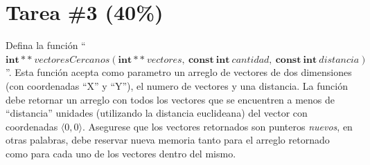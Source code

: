 \documentclass{article}
\begin{document}
\section*{Tarea \#3 (40\%)}

Defina la funci\'on ``$\mathbf{int**}\ vectoresCercanos(\mathbf{int**}\ vectores,\ \mathbf{const\ int}\ cantidad,\ \mathbf{const\ int}\ distancia)$''.
Esta funci\'on acepta como parametro un arreglo de vectores de dos dimensiones (con coordenadas ``X'' y ``Y''), el
numero de vectores y una distancia. La funci\'on debe retornar un arreglo con todos los vectores que se encuentren
a menos de ``distancia'' unidades (utilizando la distancia euclideana) del vector con coordenadas $\langle 0,0 \rangle$.
Asegurese que los vectores retornados son punteros \emph{nuevos}, en otras palabras, debe reservar nueva memoria
tanto para el arreglo retornado como para cada uno de los vectores dentro del mismo.
\end{document}
